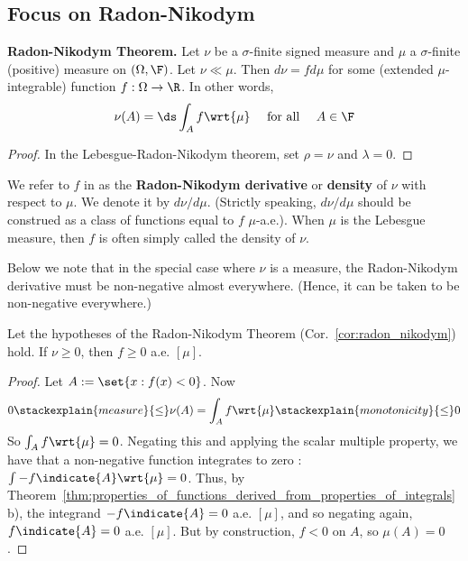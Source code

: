 \documentclass{article} %
\newcommand{\dmu}{\wrt{\mu}}
\begin{document}
\subsection{Focus on Radon-Nikodym}


\begin{corollary}{\textbf{Radon-Nikodym Theorem.}}
Let $\nu$ be a $\sigma$-finite signed measure and $\mu$ a $\sigma$-finite (positive) measure on $(\Omega, \F)$.  Let $\nu \ll \mu$. Then $d \nu = f d\mu$ for some (extended $\mu$-integrable) function $f: \Omega \to \R$. In other words,
\begin{align}
 \nu(A) = \ds\int_A f \wrt{\mu} \quad \text{ for all } \quad A \in \F 
 \label{eqn:radon_nikodym}	
\end{align}
\label{cor:radon_nikodym}
\end{corollary}

\begin{proof}
In the Lebesgue-Radon-Nikodym theorem, set $\rho=\nu$ and $\lambda=0$.	
\end{proof}


\begin{terminology}
We refer to $f$ in  as the \textbf{Radon-Nikodym derivative} or \textbf{density} of $\nu$ with respect to $\mu$.   We denote it by $d\nu/d\mu$.  (Strictly speaking, $d\nu/d\mu$ should be construed as a class of functions equal to $f$ $\mu$-a.e.). When $\mu$ is the Lebesgue measure, then $f$ is often simply called the density of $\nu$.
\end{terminology}

Below we note that in the special case where $\nu$ is a measure, the Radon-Nikodym derivative must be non-negative almost everywhere. (Hence, it can be taken to be non-negative everywhere.)
 
\begin{corollary}
Let the hypotheses of the Radon-Nikodym Theorem (Cor.~\ref{cor:radon_nikodym}) hold.  If $\nu \geq 0$, then $f \geq 0$ a.e. $[\mu]$. 
\end{corollary}

\begin{proof}
Let $A := \set{x : f(x) < 0}$.  Now 
\[ 0 \stackexplain{measure}{\leq} \nu(A) = \int_A f \dmu \stackexplain{monotonicity}{\leq} 0 \]
So $\int_A f \dmu =0$.  Negating this and applying the scalar multiple property, we have that a non-negative function integrates to zero :  $\int - f \indicate{A} \dmu =0$.  Thus, by Theorem~\ref{thm:properties_of_functions_derived_from_properties_of_integrals} b), the integrand $- f \indicate{A} =0$ a.e. $[\mu]$, and so negating again, $f \indicate{A} =0$ a.e. $[\mu]$.  But by construction, $f < 0$ on $A$, so $\mu(A)=0$.
\end{proof}
\end{document}
